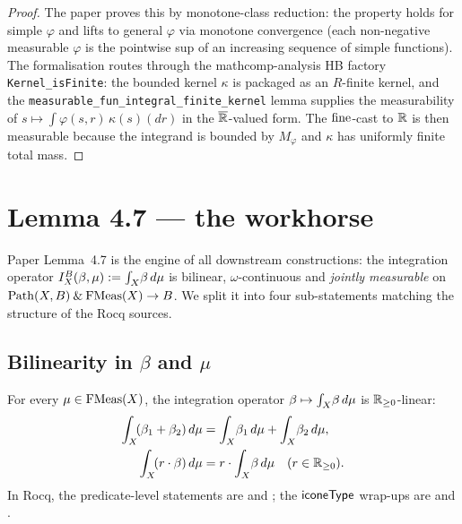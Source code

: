 \begin{proof}
The paper proves this by monotone-class reduction: the property
holds for simple $\varphi$ and lifts to general $\varphi$ via
monotone convergence (each non-negative measurable $\varphi$ is the
pointwise sup of an increasing sequence of simple functions). The
formalisation routes through the mathcomp-analysis HB factory
\texttt{Kernel\_isFinite}: the bounded kernel $\kappa$ is packaged
as an $R$-finite kernel, and the
\texttt{measurable\_fun\_integral\_finite\_kernel} lemma supplies
the measurability of $s \mapsto \int \varphi(s, r)\,\kappa(s)(dr)$
in the $\overline{\mathbb{R}}$-valued form. The $\mathrm{fine}$-cast to $\mathbb{R}$ is
then measurable because the integrand is bounded by $M_\varphi$ and
$\kappa$ has uniformly finite total mass.
\end{proof}

\section{Lemma 4.7 --- the workhorse}\label{sec:lemma47}

Paper Lemma~4.7 is the engine of all downstream constructions: the
integration operator $I^B_X(\beta, \mu) := \int_{X}\!\beta\,d\mu$
is bilinear, $\omega$-continuous and \emph{jointly measurable} on
$\mathrm{Path}(X, B) \mathbin{\&} \mathrm{FMeas}(X) \to B$. We split it into four
sub-statements matching the structure of the Rocq sources.

\subsection{Bilinearity in \texorpdfstring{$\beta$}{beta} and \texorpdfstring{$\mu$}{mu}}\label{ssec:bilinear}

\begin{lemma}\label{lem:integral-lin-beta}
For every $\mu \in \mathrm{FMeas}(X)$, the integration operator
$\beta \mapsto \int_{X}\!\beta\,d\mu$ is $\mathbb{R}_{\geq 0}$-linear:
\begin{align*}
  \int_{X}\!(\beta_1 + \beta_2)\,d\mu &= \int_{X}\!\beta_1\,d\mu
    + \int_{X}\!\beta_2\,d\mu, \\
  \int_{X}\!(r \cdot \beta)\,d\mu &= r \cdot \int_{X}\!\beta\,d\mu
    \quad (r \in \mathbb{R}_{\geq 0}).
\end{align*}
In Rocq, the predicate-level statements are
 and
; the
$\mathsf{iconeType}$ wrap-ups are
 and
. \rocqok
\end{lemma}

